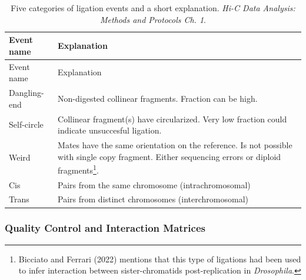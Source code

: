 \documentclass[
  11pt,
  a4paper,
]{scrbook}
\let\oldemph\emph
\renewcommand\emph[1]{\oldemph{\color{gray}#1}}
\begin{document}
\begin{longtable}[]{@{}
  >{\raggedright\arraybackslash}p{}
  >{\raggedright\arraybackslash}p{}@{}}
\caption{Five categories of ligation events and a short explanation.
\emph{Hi-C Data Analysis: Methods and Protocols Ch.
1}.}\label{tbl-ligation-events}\tabularnewline
\toprule\noalign{}
\begin{minipage}[b]{\linewidth}\raggedright
Event name
\end{minipage} & \begin{minipage}[b]{\linewidth}\raggedright
Explanation
\end{minipage} \\
\midrule\noalign{}
\endfirsthead
\toprule\noalign{}
\begin{minipage}[b]{\linewidth}\raggedright
Event name
\end{minipage} & \begin{minipage}[b]{\linewidth}\raggedright
Explanation
\end{minipage} \\
\midrule\noalign{}
\endhead
\bottomrule\noalign{}
\endlastfoot
Dangling-end & Non-digested collinear fragments. Fraction can be
high. \\
Self-circle & Collinear fragment(s) have circularized. Very low fraction
could indicate unsuccesful ligation. \\
Weird & Mates have the same orientation on the reference. Is not
possible with single copy fragment. Either sequencing errors or diploid
fragments\footnote{Bicciato and Ferrari (2022) mentions that this type
  of ligations had been used to infer interaction between
  sister-chromatids post-replication in \emph{Drosophila}.}. \\
Cis & Pairs from the same chromosome (intrachromosomal) \\
Trans & Pairs from distinct chromosomes (interchromosomal) \\
\end{longtable}

\normalsize

\subsubsection{Quality Control and Interaction
Matrices}\label{quality-control-and-interaction-matrices}
\end{document}
